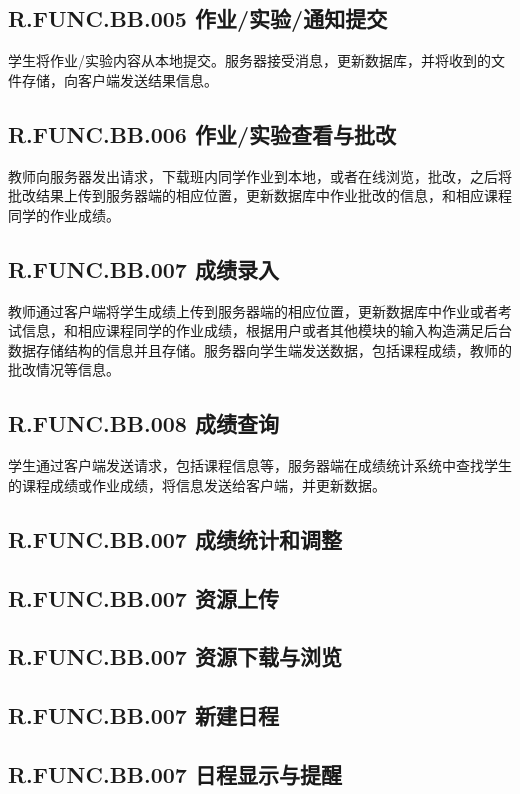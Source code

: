 \subsection{R.FUNC.BB.005   作业/实验/通知提交}
学生将作业/实验内容从本地提交。服务器接受消息，更新数据库，并将收到的文件存储，向客户端发送结果信息。

\subsection{R.FUNC.BB.006   作业/实验查看与批改}
教师向服务器发出请求，下载班内同学作业到本地，或者在线浏览，批改，之后将批改结果上传到服务器端的相应位置，更新数据库中作业批改的信息，和相应课程同学的作业成绩。

\subsection{R.FUNC.BB.007   成绩录入}
教师通过客户端将学生成绩上传到服务器端的相应位置，更新数据库中作业或者考试信息，和相应课程同学的作业成绩，根据用户或者其他模块的输入构造满足后台数据存储结构的信息并且存储。服务器向学生端发送数据，包括课程成绩，教师的批改情况等信息。

\subsection{R.FUNC.BB.008   成绩查询}
学生通过客户端发送请求，包括课程信息等，服务器端在成绩统计系统中查找学生的课程成绩或作业成绩，将信息发送给客户端，并更新数据。

\subsection{R.FUNC.BB.007   成绩统计和调整}

\subsection{R.FUNC.BB.007   资源上传}
\subsection{R.FUNC.BB.007   资源下载与浏览}
\subsection{R.FUNC.BB.007   新建日程}
\subsection{R.FUNC.BB.007   日程显示与提醒}
